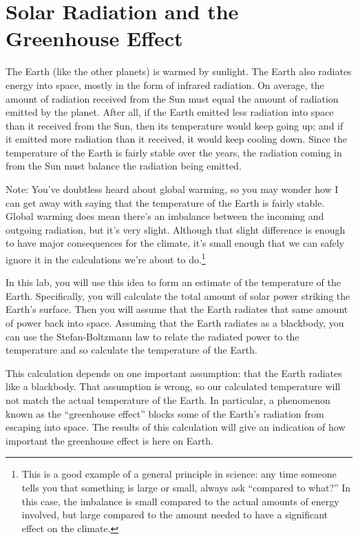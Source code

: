 \section{Solar Radiation and the Greenhouse Effect}

\makelabheader

\bigskip

The Earth (like the other planets) is warmed by
sunlight.  The Earth also radiates energy into
space, mostly in the form of infrared radiation.
On average, the amount of radiation received from the Sun
must equal the amount of radiation emitted by the planet.  After 
all, if the Earth emitted less radiation into space than it 
received from the Sun, then its temperature would keep going up;
and if it emitted more radiation than it received, it would keep
cooling down.  Since the temperature of the Earth is fairly stable
over the years, the radiation coming in from the Sun must balance
the radiation being emitted.

Note: You've doubtless heard about global warming, so you may
wonder how I can get away with saying that the temperature
of the Earth is fairly stable. Global warming does mean there's
an imbalance between the incoming and outgoing radiation, but
it's very slight. Although that slight difference is enough to have
major consequences for the climate, it's small enough that we can safely
ignore it in the calculations we're about to do.\footnote{This is a good
example of a general principle in science: any time someone tells you
that something is large or small, always ask ``compared to what?'' In
this case, the imbalance is small compared to the actual amounts
of energy involved, but large compared to the amount needed to have
a significant effect on the climate.}

In this lab, you will use this idea to form an estimate of the
temperature of the Earth.  Specifically, you will calculate
the total amount of solar power striking the Earth's surface.
Then you will assume that the Earth radiates that same amount
of power back into space.  Assuming that the Earth radiates
as a blackbody, you can use the Stefan-Boltzmann law to 
relate the radiated power to the temperature and so calculate
the temperature of the Earth.

This calculation depends on one important assumption: that the
Earth radiates like a blackbody.  That assumption is wrong,
so our calculated temperature will not match the actual
temperature of the Earth.  In particular, a phenomenon
known as the ``greenhouse effect'' blocks some of the
Earth's radiation from escaping into space.  The results
of this calculation will give an indication of how important
the greenhouse effect is here on Earth.

